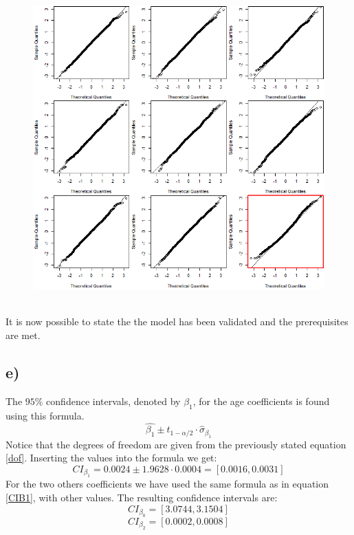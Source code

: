 \begin{figure}[ht!]
  \centering
  \includegraphics[width=0.75\linewidth]{root/Wally_res.png}
  \label{WallyVal}
\end{figure} \\
It is now possible to state the the model has been validated and the prerequisites are met.

\subsection{e)}
The $95\%$ confidence intervals, denoted by $\beta_1$, for the 
age coefficients is found using this formula.
\[ \hat{\beta_1} \pm t_{1-\alpha/2} \cdot \hat{\sigma}_{\beta_1} \]
Notice that the degrees of freedom are given from the previously stated equation \ref{dof}. Inserting the values into the formula we get:
\begin{equation}\label{CIB1}
CI_{\beta_1} = 0.0024 \pm 1.9628 \cdot 0.0004 = [0.0016 , 0.0031]
\end{equation}
For the two others coefficients we have used the same formula as in equation \ref{CIB1}, with other values. The resulting confidence intervals are:
\[ CI_{\beta_0} = [3.0744 , 3.1504] \]
\[ CI_{\beta_2} = [0.0002 , 0.0008] \]

